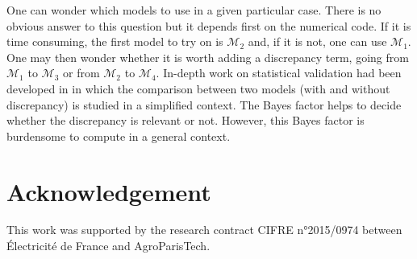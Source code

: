 \documentclass[soumission]{jsfds}
\begin{document}

One can wonder which models to use in a given particular case. There is no obvious answer to this question but it depends first on the numerical code. If it is time consuming, the first model to try on is $\mathcal{M}_2$ and, if it is not, one can use $\mathcal{M}_1$. One may then wonder whether it is worth adding a discrepancy term, going from $\mathcal{M}_1$ to $\mathcal{M}_3$ or from $\mathcal{M}_2$ to $\mathcal{M}_4$. In-depth work on statistical validation had been developed in \citet{damblin2016} in which the comparison between two models (with and without discrepancy) is studied in a simplified context. The Bayes factor helps to decide whether the discrepancy is relevant or not. However, this Bayes factor is burdensome to compute in a general context.




\section{Acknowledgement}
This work was supported by the research contract CIFRE n°2015/0974 between Électricité de France and AgroParisTech.

%
\end{document}
